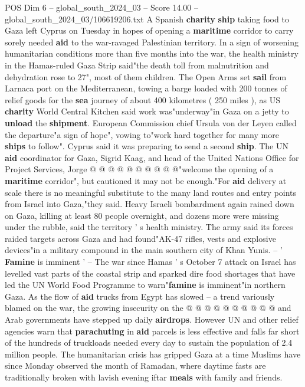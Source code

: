 \begin{textsample}{POS Dim 6 – global\_south\_2024\_03 – Score 14.00 – global\_south\_2024\_03/106619206.txt}  \label{ex:f6_pos_032}
A Spanish \textbf{charity} \textbf{ship} taking food to Gaza left Cyprus on Tuesday in hopes of opening a \textbf{maritime} corridor to carry sorely needed \textbf{aid} to the war-ravaged Palestinian territory.
In a sign of worsening humanitarian conditions more than five months into the war, the health ministry in the Hamas-ruled Gaza Strip said"the death toll from malnutrition and dehydration rose to 27", most of them children.
The Open Arms set \textbf{sail} from Larnaca port on the Mediterranean, towing a barge loaded with 200 tonnes of relief goods for the \textbf{sea} journey of about 400 kilometres ( 250 miles ), as US \textbf{charity} World Central Kitchen said work was"underway"in Gaza on a jetty to \textbf{unload} the \textbf{shipment}.
European Commission chief Ursula von der Leyen called the departure"a sign of hope", vowing to"work hard together for many more \textbf{ships} to follow".
Cyprus said it was preparing to send a second \textbf{ship}.
The UN \textbf{aid} coordinator for Gaza, Sigrid Kaag, and head of the United Nations Office for Project Services, Jorge @ @ @ @ @ @ @ @ @ @"welcome the opening of a \textbf{maritime} corridor", but cautioned it may not be enough."For \textbf{aid} delivery at scale there is no meaningful substitute to the many land routes and entry points from Israel into Gaza,"they said.
Heavy Israeli bombardment again rained down on Gaza, killing at least 80 people overnight, and dozens more were missing under the rubble, said the territory ' s health ministry.
The army said its forces raided targets across Gaza and had found"AK-47 rifles, vests and explosive devices"in a military compound in the main southern city of Khan Yunis. -- ' \textbf{Famine} is imminent ' -- The war since Hamas ' s October 7 attack on Israel has levelled vast parts of the coastal strip and sparked dire food shortages that have led the UN World Food Programme to warn"\textbf{famine} is imminent"in northern Gaza.
As the flow of \textbf{aid} trucks from Egypt has slowed -- a trend variously blamed on the war, the growing insecurity on the @ @ @ @ @ @ @ @ @ @ and Arab governments have stepped up daily \textbf{airdrops}.
However UN and other relief agencies warn that \textbf{parachuting} in \textbf{aid} parcels is less effective and falls far short of the hundreds of truckloads needed every day to sustain the population of 2.4 million people.
The humanitarian crisis has gripped Gaza at a time Muslims have since Monday observed the month of Ramadan, where daytime fasts are traditionally broken with lavish evening iftar \textbf{meals} with family and friends.

\end{textsample}
